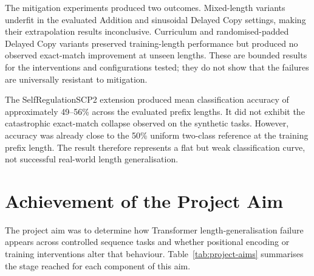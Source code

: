 \documentclass[
    author={Aanchala Ravindra Bhongade},
    supervisor={Dr. Fernando Moreno-Pino},
    degree={MSc},
    title={Length Generalisation in Transformer-Based Sequence Models: Failure Taxonomy and Mitigation Strategies},
    subtitle={},
    type={},
    year={2026}
]{dissertation}
\begin{document}
The mitigation experiments produced two outcomes. Mixed-length variants underfit in the evaluated Addition and sinusoidal Delayed Copy settings, making their extrapolation results inconclusive. Curriculum and randomised-padded Delayed Copy variants preserved training-length performance but produced no observed exact-match improvement at unseen lengths. These are bounded results for the interventions and configurations tested; they do not show that the failures are universally resistant to mitigation.

The SelfRegulationSCP2 extension produced mean classification accuracy of approximately 49--56\% across the evaluated prefix lengths. It did not exhibit the catastrophic exact-match collapse observed on the synthetic tasks. However, accuracy was already close to the 50\% uniform two-class reference at the training prefix length. The result therefore represents a flat but weak classification curve, not successful real-world length generalisation.

\section{Achievement of the Project Aim}

The project aim was to determine how Transformer length-generalisation failure appears across controlled sequence tasks and whether positional encoding or training interventions alter that behaviour. Table~\ref{tab:project-aims}
summarises the stage reached for each component of this aim.
\end{document}
